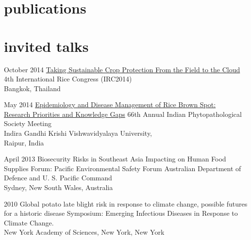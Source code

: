 \documentclass[]{friggeri-cv}
\begin{document}


\section{publications}

\begin{refsection}
  \nocite{*}
  \printbibliography[sorting=chronological, type=inproceedings, title={conferences/proceedings},  heading=subbibliography]
\end{refsection}
\begin{refsection}
  \nocite{*}
  \printbibliography[sorting=chronological, type=inbook, title={book chapters}, heading=subbibliography]
\end{refsection}
\begin{refsection}
  \nocite{*}
  \printbibliography[sorting=chronological, type=report, title={reports}, heading=subbibliography]
\end{refsection}

\section{invited talks}
\begin{entrylist}
 \entry
	{October 2014}
	{\href{http://figshare.com/articles/Taking_Sustainable_Crop_Protection_From_the_Field_to_the_Cloud/1225800}{Taking Sustainable Crop Protection From the Field to the Cloud}}
	{}
	{4th International Rice Congress (IRC2014)\\Bangkok, Thailand}
	{}
	
 \entry
 	{May 2014}
	{\href{http://figshare.com/articles/IPS_2014/1037569}{Epidemiology and Disease Management of Rice Brown Spot:\\Research Priorities and Knowledge Gaps}}
	{}
	{66th Annual Indian Phytopathological Society Meeting\\Indira Gandhi Krishi Vishwavidyalaya University,\\Raipur, India}
	
 \entry
	{April 2013}
	{Biosecurity Risks in Southeast Asia Impacting on Human Food Supplies}
	{}
	{Forum: Pacific Environmental Safety Forum Australian Department of Defence and U. S. Pacific Command\\Sydney, New South Wales, Australia}

 \entry
	 {2010} 
	{Global potato late blight risk in response to climate change, possible futures for a historic disease}
  	{}
  	{Symposium: Emerging Infectious Diseases in Response to Climate Change.\\New York Academy of Sciences, New York, New York}
\end{entrylist}
\end{document}

